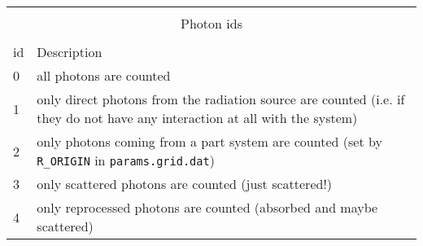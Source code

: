 \documentclass[12pt,a4paper]{article}
\begin{document}
\vspace{1cm}
{\centering 
\begin{tabular}{|p{1cm}|p{16.1cm}|}
\hline
\multicolumn{2}{|c|}{}\\ 
\multicolumn{2}{|c|}{\large Photon ids}\\
\multicolumn{2}{|c|}{}\\  
\hline
id & Description \\
\hline
0  & all photons are counted  \\
1  &  only direct photons  from the radiation source are  counted (i.e. if they do not have any interaction at all with the system)\\
2  &  only  photons  coming from a part system are counted (set by \texttt{R\_ORIGIN} in \texttt{params.grid.dat}) \\
3  & only scattered photons are counted (just scattered!) \\
4  & only reprocessed photons are counted (absorbed and maybe scattered) \\
\hline
\end{tabular}
\par}
\end{document}
